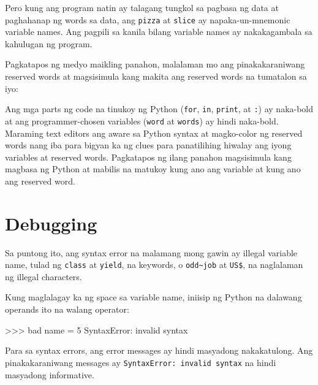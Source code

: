 \documentclass[10pt,]{book}
\newenvironment{Shaded}{}{}
\newcommand{\DecValTok}[1]{\textcolor[rgb]{0.25,0.63,0.44}{#1}}
\newcommand{\NormalTok}[1]{#1}
\newcommand{\OperatorTok}[1]{\textcolor[rgb]{0.40,0.40,0.40}{#1}}
\newcommand{\PreprocessorTok}[1]{\textcolor[rgb]{0.74,0.48,0.00}{#1}}
\begin{document}
Pero kung ang program natin ay talagang tungkol sa pagbasa ng data at
paghahanap ng words sa data, ang \texttt{pizza} at \texttt{slice} ay
napaka-un-mnemonic variable names. Ang pagpili sa kanila bilang variable
names ay nakakagambala sa kahulugan ng program.

Pagkatapos ng medyo maikling panahon, malalaman mo ang pinakakaraniwang
reserved words at magsisimula kang makita ang reserved words na
tumatalon sa iyo:

Ang mga parts ng code na tinukoy ng Python (\texttt{for}, \texttt{in},
\texttt{print}, at \texttt{:}) ay naka-bold at ang programmer-chosen
variables (\texttt{word} at \texttt{words}) ay hindi naka-bold. Maraming
text editors ang aware sa Python syntax at magko-color ng reserved words
nang iba para bigyan ka ng clues para panatilihing hiwalay ang iyong
variables at reserved words. Pagkatapos ng ilang panahon magsisimula
kang magbasa ng Python at mabilis na matukoy kung ano ang variable at
kung ano ang reserved word.

\section{Debugging}\label{debugging-1}


Sa puntong ito, ang syntax error na malamang mong gawin ay illegal
variable name, tulad ng \texttt{class} at \texttt{yield}, na keywords, o
\texttt{odd\textasciitilde{}job} at \texttt{US\$}, na naglalaman ng
illegal characters.

 

Kung maglalagay ka ng space sa variable name, iniisip ng Python na
dalawang operands ito na walang operator:

\begin{Shaded}
\begin{Highlighting}[]
\OperatorTok{\textgreater{}\textgreater{}\textgreater{}}\NormalTok{ bad name }\OperatorTok{=} \DecValTok{5}
\PreprocessorTok{SyntaxError}\NormalTok{: invalid syntax}
\end{Highlighting}
\end{Shaded}

Para sa syntax errors, ang error messages ay hindi masyadong
nakakatulong. Ang pinakakaraniwang messages ay
\texttt{SyntaxError:\ invalid\ syntax} na hindi masyadong informative.

  
 
\end{document}
